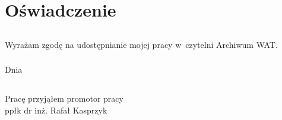 \chapter*{Oświadczenie}

\section*{}
Wyrażam zgodę na udostępnianie mojej pracy w~czytelni Archiwum WAT.

\subsection*{}
Dnia \dotfill

\section*{}
\begin{flushright}
	Pracę przyjąłem
	\linebreak
	\linebreak
	\linebreak
	\linebreak
	promotor pracy\\
	ppłk dr inż. Rafał Kasprzyk
\end{flushright}
